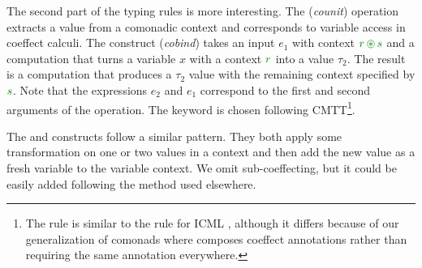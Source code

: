 The second part of the typing rules is more interesting. The (\emph{counit}) operation extracts
a value from a comonadic context and corresponds to variable access in coeffect calculi. The
 construct (\emph{cobind}) takes an input $e_1$ with context $\cclrd{r}\,\cseq\,\cclrd{s}$
and a computation that turns a variable $x$ with a context $\cclrd{r}$ into a value $\tau_2$.
The result is a computation that produces a $\tau_2$ value with the remaining context specified
by $\cclrd{s}$. Note that the expressions $e_2$ and $e_1$ correspond to the first and second
arguments of the  operation. The keyword  is chosen following 
CMTT\footnote{The rule is similar to the  rule for ICML \cite[p. 14]{logic-cmtt},
although it differs because of our generalization of comonads where  composes
coeffect annotations rather than requiring the same annotation everywhere.}.

The  and  constructs follow a similar pattern. They both apply some 
transformation on one or two values in a context and then add the new value as a fresh variable
to the variable context. We omit sub-coeffecting, but it could be easily added following 
the method used elsewhere.


